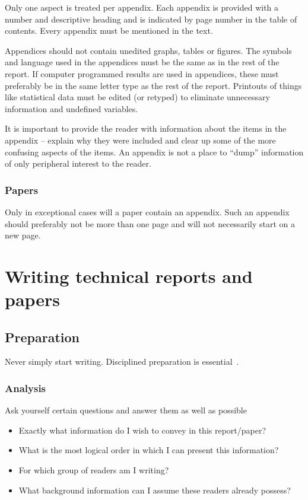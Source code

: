 \documentclass[a5paper, 10pt]{article}
\begin{document}
Only one aspect is treated per appendix.  Each appendix is provided
with a number and descriptive heading and is indicated by page number
in the table of contents.  Every appendix must be mentioned in the
text.

Appendices should not contain unedited graphs, tables or figures.  The
symbols and language used in the appendices must be the same as in the
rest of the report.  If computer programmed results are used in
appendices, these must preferably be in the same letter type as the
rest of the report.  Printouts of things like statistical data must be
edited (or retyped) to eliminate unnecessary information and undefined
variables.

It is important to provide the reader with information about the items
in the appendix -- explain why they were included and clear up some of
the more confusing aspects of the items.  An appendix is not a place
to ``dump'' information of only peripheral interest to the reader.

\subsubsection{Papers}
Only in exceptional cases will a paper contain an appendix.  Such an
appendix should preferably not be more than one page and will not
necessarily start on a new page.

\section{Writing technical reports and papers}
\label{cha:writing-reports}

\subsection{Preparation}
Never simply start writing.  Disciplined preparation is
essential~\citep{johnson}.

\subsubsection{Analysis}

Ask yourself certain questions and answer them as well as possible

\begin{itemize}
\item Exactly what information do I wish to convey in this report/paper?
\item What is the most logical order in which I can present this
  information?
\item For which group of readers am I writing?
\item What background information can I assume these readers already
  possess?
\end{itemize}
\end{document}
